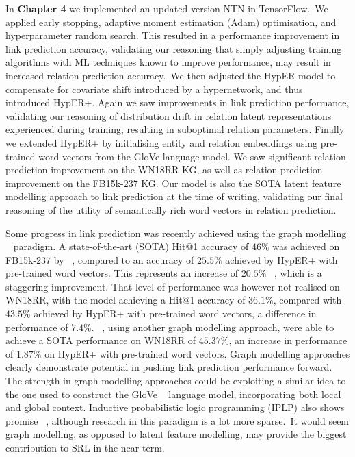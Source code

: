 \noindent In \textbf{Chapter 4} we implemented an updated version NTN in TensorFlow.\ We applied early stopping, adaptive moment estimation (Adam) optimisation, and hyperparameter random search. This resulted in a performance improvement in link prediction accuracy, validating our reasoning that simply adjusting training algorithms with ML techniques known to improve performance, may result in increased relation prediction accuracy.\ We then adjusted the HypER model to compensate for covariate shift introduced by a hypernetwork, and thus introduced HypER+. Again we saw improvements in link prediction performance, validating our reasoning of distribution drift in relation latent representations experienced during training, resulting in suboptimal relation parameters. Finally we extended HypER+ by initialising entity and relation embeddings using pre-trained word vectors from the GloVe language model. We saw significant relation prediction improvement on the WN18RR KG, as well as relation prediction improvement on the FB15k-237 KG. Our model is also the SOTA latent feature modelling approach to link prediction at the time of writing, validating our final reasoning of the utility of semantically rich word vectors in relation prediction. \par

\noindent Some progress in link prediction was recently achieved using the graph modelling \unskip ~\citep{Nickel_2016} paradigm. A state-of-the-art (SOTA) Hit@1 accuracy of $ 46\% $ was achieved on FB15k-237 by \unskip ~\citep{nathani2019learning}, compared to an accuracy of $ 25.5\% $ achieved by HypER+ with pre-trained word vectors. This represents an increase of $ 20.5 \% $ \unskip ~\citep{ruderNLPProg}, which is a staggering improvement. That level of performance was however not realised on WN18RR, with the model achieving a Hit@1 accuracy of $ 36.1\% $, compared with $ 43.5 \% $ achieved by HypER+ with pre-trained word vectors, a difference in performance of $ 7.4\% $. \unskip ~\citep{pinter-eisenstein-2018-predicting}, using another graph modelling approach, were able to achieve a SOTA performance on WN18RR of $ 45.37\% $, an increase in performance of $ 1.87\% $ on HypER+ with pre-trained word vectors. Graph modelling approaches clearly demonstrate potential in pushing link prediction performance forward. The strength in graph modelling approaches could be exploiting a similar idea to the one used to construct the GloVe \unskip ~\citep{pennington2014glove} language model, incorporating both local and global context. Inductive probabilistic logic programming (IPLP) also shows promise \unskip ~\citep{dong2019neural, manhaeve2018deepproblog}, although research in this paradigm is a lot more sparse.\ It would seem graph modelling, as opposed to latent feature modelling, may provide the biggest contribution to SRL in the near-term. 
